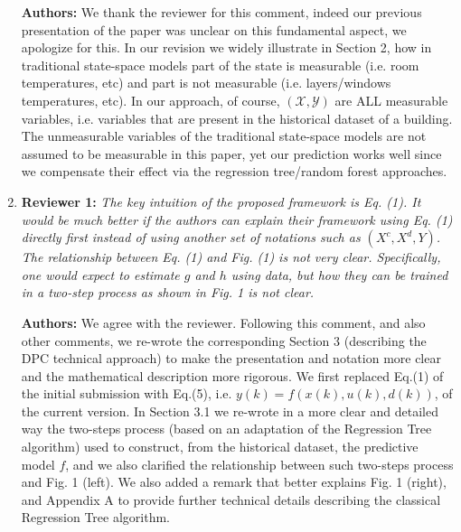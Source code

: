 \documentclass{article}
\begin{document}
\begin{enumerate}
\textbf{Authors:} We thank the reviewer for this comment, indeed our previous presentation of the paper was unclear on this fundamental aspect, we apologize for this. In our revision we widely illustrate in Section 2, how in traditional state-space models part of the state is measurable (i.e. room temperatures, etc) and part is not measurable (i.e. layers/windows temperatures, etc). In our approach, of course, $(\mathcal{X}, \mathcal{Y})$ are ALL measurable variables, i.e. variables that are present in the historical dataset of a building. The unmeasurable variables of the traditional state-space models are not assumed to be measurable in this paper, yet our prediction works well since we compensate their effect via the regression tree/random forest approaches.



\item \textbf{Reviewer 1:} \textit{The key intuition of the proposed framework is Eq. (1). It would be much better if the authors can explain their framework using Eq. (1) directly first instead of using another set of notations such as $(X^c, X^d, Y)$. The relationship between Eq. (1) and Fig. (1) is not very clear. Specifically, one would expect to estimate $g$ and $h$ using data, but how they can be trained in a two-step process as shown in Fig. 1 is not clear.}



\textbf{Authors:} We agree with the reviewer. Following this comment, and also other comments, we re-wrote the corresponding Section 3 (describing the DPC technical approach) to make the presentation and notation more clear and the mathematical description more rigorous. We first replaced Eq.(1) of the initial submission with Eq.(5), i.e. $y(k)=f(x(k),u(k),d(k))$, of the current version. In Section 3.1 we re-wrote in a more clear and detailed way the two-steps process (based on an adaptation of the Regression Tree algorithm) used to construct, from the historical dataset, the predictive model $f$, and we also clarified the relationship between such two-steps process and Fig. 1 (left). We also added a remark that better explains Fig. 1 (right), and Appendix A to provide further technical details describing the classical Regression Tree algorithm.


\end{enumerate}


\end{document}
